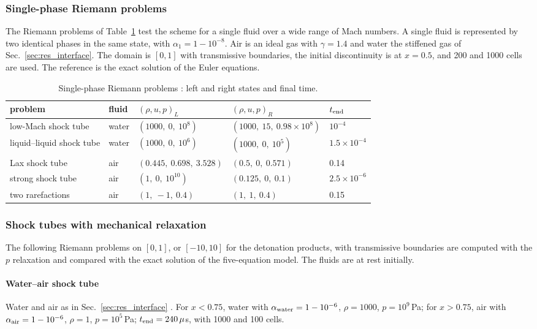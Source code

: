 \subsubsection{Single-phase Riemann problems}
\label{sec:res_single}
The Riemann problems of Table~\ref{tab:single} \cite[Secs.~5.1, 5.1.1]{Schropff2026} test the scheme for a single fluid over a wide
range of Mach numbers. A single fluid is represented by two identical phases in the same state, with
$\alpha_1=1-10^{-8}$. Air is an ideal gas with $\gamma=1.4$ and water the stiffened gas of Sec.~\ref{sec:res_interface}. The
domain is $[0,1]$ with transmissive boundaries, the initial discontinuity is at $x=0.5$, and 200 and 1000 cells are
used. The reference is the exact solution of the Euler equations.
\begin{table}[t]
\centering\small
\caption{Single-phase Riemann problems \cite{Schropff2026}: left and right states and final time.}
\label{tab:single}
\begin{tabular}{lllll}
\toprule
problem & fluid & $(\rho,u,p)_L$ & $(\rho,u,p)_R$ & $t_{\rm end}$ \\
\midrule
low-Mach shock tube & water & $(1000,\ 0,\ 10^8)$ & $(1000,\ 15,\ 0.98\times10^8)$ & $10^{-4}$ \\
liquid--liquid shock tube & water & $(1000,\ 0,\ 10^6)$ & $(1000,\ 0,\ 10^5)$ & $1.5\times10^{-4}$ \\
Lax shock tube & air & $(0.445,\ 0.698,\ 3.528)$ & $(0.5,\ 0,\ 0.571)$ & 0.14 \\
strong shock tube & air & $(1,\ 0,\ 10^{10})$ & $(0.125,\ 0,\ 0.1)$ & $2.5\times10^{-6}$ \\
two rarefactions & air & $(1,\ -1,\ 0.4)$ & $(1,\ 1,\ 0.4)$ & 0.15 \\
\bottomrule
\end{tabular}
\end{table}

\subsubsection{Shock tubes with mechanical relaxation}
\label{sec:res_shock}
The following Riemann problems on $[0,1]$, or $[-10,10]$ for the detonation products, with transmissive boundaries
are computed with the $p$ relaxation and compared with the exact solution of the five-equation model. The fluids are
at rest initially.

\paragraph{Water--air shock tube}
Water and air as in Sec.~\ref{sec:res_interface} \cite[Sec.~4.3.1]{SPB2009}. For $x<0.75$, water with
$\alpha_{\rm water}=1-10^{-6}$, $\rho=1000$, $p=10^9$\,Pa; for $x>0.75$, air with $\alpha_{\rm air}=1-10^{-6}$, $\rho=1$, $p=10^5$\,Pa;
$t_{\rm end}=240\,\mu$s, with 1000 and 100 cells.

